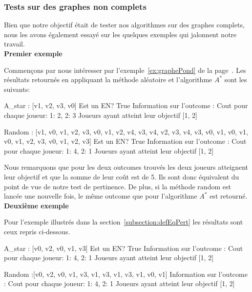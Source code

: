 \FloatBarrier

\subsubsection*{Tests sur des graphes non complets}

Bien que notre objectif était de tester nos algorithmes sur des graphes complets, nous les avons également essayé sur les quelques exemples qui jalonnent notre travail. \\

\noindent \textbf{Premier exemple}

Commençons par nous intéresser par l'exemple~\ref{ex:graphePond} de la page~\pageref{ex:graphePond}. Les résultats retournés en appliquant la méthode aléatoire et l'algorithme $A^*$ sont les suivants:

\begin{code}

A_star : [v1, v2, v3, v0]
Est un EN?  True
Information sur l'outcome : 
Cout pour chaque joueur:  {1: 2, 2: 3}
Joueurs ayant atteint leur objectif  [1, 2]

Random :  [v1, v0, v1, v2, v3, v0, v1, v2,
v4, v3, v4, v2, v3, v4, v3, v0, v1, v0, v1,
v0, v1, v2, v3, v0, v1, v2, v3]
Est un EN?  True
Information sur l'outcome :
Cout pour chaque joueur:  {1: 4, 2: 1}
Joueurs ayant atteint leur objectif  [1, 2]

\end{code}


Nous remarquons que pour les deux outcomes trouvés les deux joueurs atteignent leur objectif et que la somme de leur coût est de 5. Ils sont donc équivalent du point de vue de notre test de pertinence. De plus, si la méthode random est lancée une nouvelle fois, le même outcome que pour l'algorithme $A^*$ est retourné. \\

\noindent \textbf{Deuxième exemple}

Pour l'exemple illustrés dans la section~\ref{subsection:defEqPert} les résultats sont ceux repris ci-dessous.
\begin{code}
A_star : [v0, v2, v0, v1, v3]
Est un EN?  True
Information sur l'outcome : 
Cout pour chaque joueur:  {1: 4, 2: 1}
Joueurs ayant atteint leur objectif  [1, 2]

Random :[v0, v2, v0, v1, v3, v1, v3,
v1, v3, v1, v0, v1]
Information sur l'outcome :
Cout pour chaque joueur:  {1: 4, 2: 1}
Joueurs ayant atteint leur objectif  [1, 2]

\end{code}

